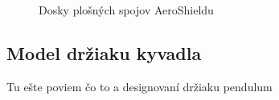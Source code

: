 \begin{figure}
	\hfill
	\hfill
	\hfill
	\caption{Dosky plošných spojov AeroShieldu}\label{OBRAZOK 2.7}
\end{figure}

\subsection{Model držiaku kyvadla}

Tu ešte poviem čo to a designovaní držiaku pendulum
